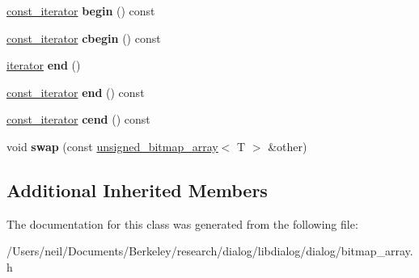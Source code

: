 \begin{DoxyCompactItemize}
\hyperlink{classdialog_1_1const__bitmap__array__iterator}{const\+\_\+iterator} {\bfseries begin} () const
\item 
\mbox{\label{classdialog_1_1signed__bitmap__array_aa77ba1c6fddf982add741843b2ca25dd}} 
\hyperlink{classdialog_1_1const__bitmap__array__iterator}{const\+\_\+iterator} {\bfseries cbegin} () const
\item 
\mbox{\label{classdialog_1_1signed__bitmap__array_a416169196b3a63b506214b5763a2ea17}} 
\hyperlink{classdialog_1_1bitmap__array__iterator}{iterator} {\bfseries end} ()
\item 
\mbox{\label{classdialog_1_1signed__bitmap__array_a25c24d7f1165143360edfd4dd7dec7a1}} 
\hyperlink{classdialog_1_1const__bitmap__array__iterator}{const\+\_\+iterator} {\bfseries end} () const
\item 
\mbox{\label{classdialog_1_1signed__bitmap__array_a34b623b88097d0b22ee83449d15871cc}} 
\hyperlink{classdialog_1_1const__bitmap__array__iterator}{const\+\_\+iterator} {\bfseries cend} () const
\item 
\mbox{\label{classdialog_1_1signed__bitmap__array_a8b0d1f5fec4ec82d047d945b8edb4970}} 
void {\bfseries swap} (const \hyperlink{classdialog_1_1unsigned__bitmap__array}{unsigned\+\_\+bitmap\+\_\+array}$<$ T $>$ \&other)
\end{DoxyCompactItemize}
\subsection*{Additional Inherited Members}


The documentation for this class was generated from the following file\+:\begin{DoxyCompactItemize}
\item 
/\+Users/neil/\+Documents/\+Berkeley/research/dialog/libdialog/dialog/bitmap\+\_\+array.\+h\end{DoxyCompactItemize}
